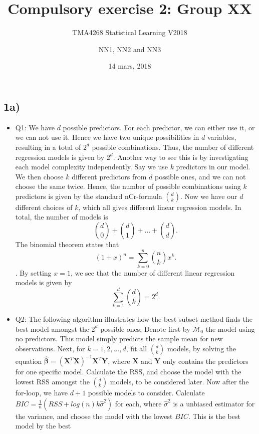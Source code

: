 \documentclass[]{article}
\title{Compulsory exercise 2: Group XX}
\subtitle{TMA4268 Statistical Learning V2018}
\author{NN1, NN2 and NN3}
\date{14 mars, 2018}
\begin{document}
\maketitle

\subsection{1a)}\label{a}

\begin{itemize}
\item
  Q1: We have \(d\) possible predictors. For each predictor, we can
  either use it, or we can not use it. Hence we have two unique
  possibilities in \(d\) variables, resulting in a total of \(2^d\)
  possible combinations. Thus, the number of different regression models
  is given by \(2^d\). Another way to see this is by investigating each
  model complexity independently. Say we use \(k\) predictors in our
  model. We then choose \(k\) different predictors from \(d\) possible
  ones, and we can not choose the same twice. Hence, the number of
  possible combinations using \(k\) predictors is given by the standard
  nCr-formula \(\binom{d}{k}\). Now we have our \(d\) different choices
  of \(k\), which all gives different linear regression models. In
  total, the number of models is
  \[\binom{d}{0}+\binom{d}{1}+\dots+\binom{d}{d}.\] The binomial theorem
  states that \[(1+x)^n=\sum_{k=0}^n \binom{n}{k} x^k.\]. By setting
  \(x=1\), we see that the number of different linear regression models
  is given by \[\sum_{k=1}^d \binom{d}{k}=2^d.\]
\item
  Q2: The following algorithm illustrates how the best subset method
  finds the best model amongst the \(2^d\) possible ones: Denote first
  by \(\mathcal{M}_0\) the model using no predictors. This model simply
  predicts the sample mean for new observations. Next, for
  \(k=1,2,\dots,d\), fit all \(\binom{d}{k}\) models, by solving the
  equation
  \(\hat{\boldsymbol \beta} =(\boldsymbol X^T \boldsymbol X)^{-1} \boldsymbol X^T \boldsymbol Y\),
  where \(\boldsymbol{X}\) and \(\boldsymbol{Y}\) only contains the
  predictors for one specific model. Calculate the RSS, and choose the
  model with the lowest RSS amongst the \(\binom{d}{k}\) models, to be
  considered later. Now after the for-loop, we have \(d+1\) possible
  models to consider. Calculate
  \(BIC=\frac{1}{n}(RSS+log(n)k\hat \sigma^2)\) for each, where
  \(\hat \sigma^2\) is a unbiased estimator for the variance, and choose
  the model with the lowest \(BIC\). This is the best model by the best

\end{itemize}
\end{document}
